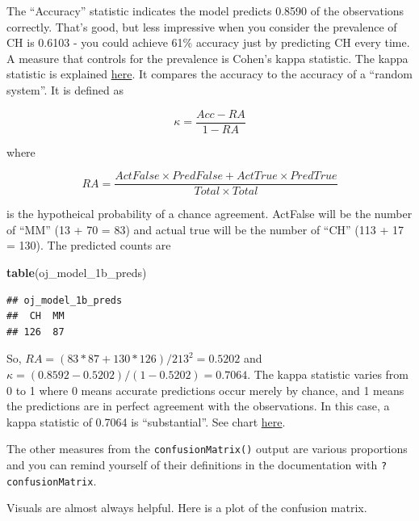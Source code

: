 \documentclass[]{book}
\newenvironment{Shaded}{\begin{snugshade}}{\end{snugshade}}
\newcommand{\DataTypeTok}[1]{\textcolor[rgb]{0.13,0.29,0.53}{#1}}
\newcommand{\KeywordTok}[1]{\textcolor[rgb]{0.13,0.29,0.53}{\textbf{#1}}}
\newcommand{\NormalTok}[1]{#1}
\newcommand{\OperatorTok}[1]{\textcolor[rgb]{0.81,0.36,0.00}{\textbf{#1}}}
\newcommand{\StringTok}[1]{\textcolor[rgb]{0.31,0.60,0.02}{#1}}
\begin{document}
The ``Accuracy'' statistic indicates the model predicts 0.8590 of the observations correctly. That's good, but less impressive when you consider the prevalence of CH is 0.6103 - you could achieve 61\% accuracy just by predicting CH every time. A measure that controls for the prevalence is Cohen's kappa statistic. The kappa statistic is explained \href{https://standardwisdom.com/softwarejournal/2011/12/confusion-matrix-another-single-value-metric-kappa-statistic/}{here}. It compares the accuracy to the accuracy of a ``random system''. It is defined as

\[\kappa = \frac{Acc - RA}{1-RA}\]

where

\[RA = \frac{ActFalse \times PredFalse + ActTrue \times PredTrue}{Total \times Total}\]

is the hypotheical probability of a chance agreement. ActFalse will be the number of ``MM'' (13 + 70 = 83) and actual true will be the number of ``CH'' (113 + 17 = 130). The predicted counts are

\begin{Shaded}
\begin{Highlighting}[]
\KeywordTok{table}\NormalTok{(oj_model_1b_preds)}
\end{Highlighting}
\end{Shaded}

\begin{verbatim}
## oj_model_1b_preds
##  CH  MM 
## 126  87
\end{verbatim}

So, \(RA = (83*87 + 130*126) / 213^2 = 0.5202\) and \(\kappa = (0.8592 - 0.5202)/(1 - 0.5202) = 0.7064\). The kappa statistic varies from 0 to 1 where 0 means accurate predictions occur merely by chance, and 1 means the predictions are in perfect agreement with the observations. In this case, a kappa statistic of 0.7064 is ``substantial''. See chart \href{https://www.statisticshowto.datasciencecentral.com/cohens-kappa-statistic/}{here}.

The other measures from the \texttt{confusionMatrix()} output are various proportions and you can remind yourself of their definitions in the documentation with \texttt{?confusionMatrix}.

Visuals are almost always helpful. Here is a plot of the confusion matrix.

\begin{Shaded}
\end{Shaded}
\end{document}
